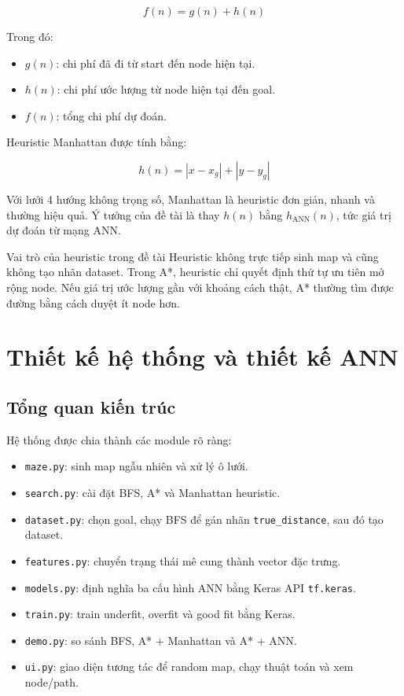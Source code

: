 \documentclass[12pt,a4paper]{article}
\begin{document}
\[
    f(n) = g(n) + h(n)
\]

Trong đó:

\begin{itemize}
    \item \(g(n)\): chi phí đã đi từ start đến node hiện tại.
    \item \(h(n)\): chi phí ước lượng từ node hiện tại đến goal.
    \item \(f(n)\): tổng chi phí dự đoán.
\end{itemize}

Heuristic Manhattan được tính bằng:

\[
    h(n) = |x - x_g| + |y - y_g|
\]

Với lưới 4 hướng không trọng số, Manhattan là heuristic đơn giản, nhanh và thường hiệu quả. Ý tưởng của đề tài là thay \(h(n)\) bằng \(h_{\text{ANN}}(n)\), tức giá trị dự đoán từ mạng ANN.

\begin{keybox}{Vai trò của heuristic trong đề tài}
Heuristic không trực tiếp sinh map và cũng không tạo nhãn dataset. Trong A*, heuristic chỉ quyết định thứ tự ưu tiên mở rộng node. Nếu giá trị ước lượng gần với khoảng cách thật, A* thường tìm được đường bằng cách duyệt ít node hơn.
\end{keybox}

\section{Thiết kế hệ thống và thiết kế ANN}

\subsection{Tổng quan kiến trúc}

Hệ thống được chia thành các module rõ ràng:

\begin{itemize}
    \item \texttt{maze.py}: sinh map ngẫu nhiên và xử lý ô lưới.
    \item \texttt{search.py}: cài đặt BFS, A* và Manhattan heuristic.
    \item \texttt{dataset.py}: chọn goal, chạy BFS để gán nhãn \texttt{true\_distance}, sau đó tạo dataset.
    \item \texttt{features.py}: chuyển trạng thái mê cung thành vector đặc trưng.
    \item \texttt{models.py}: định nghĩa ba cấu hình ANN bằng Keras API \texttt{tf.keras}.
    \item \texttt{train.py}: train underfit, overfit và good fit bằng Keras.
    \item \texttt{demo.py}: so sánh BFS, A* + Manhattan và A* + ANN.
    \item \texttt{ui.py}: giao diện tương tác để random map, chạy thuật toán và xem node/path.
\end{itemize}
\end{document}
